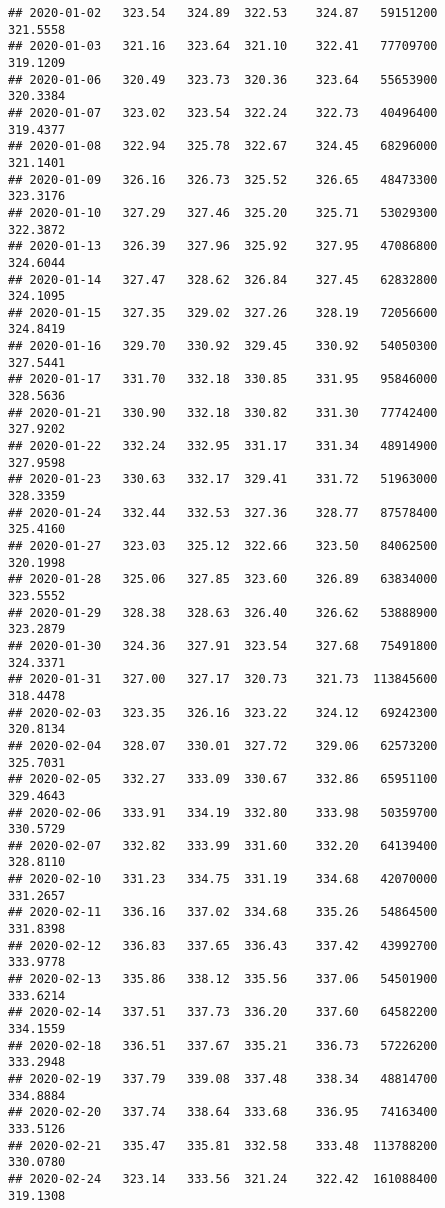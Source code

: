 \documentclass[
]{article}
\begin{document}
\begin{verbatim}
## 2020-01-02   323.54   324.89  322.53    324.87   59151200     321.5558
## 2020-01-03   321.16   323.64  321.10    322.41   77709700     319.1209
## 2020-01-06   320.49   323.73  320.36    323.64   55653900     320.3384
## 2020-01-07   323.02   323.54  322.24    322.73   40496400     319.4377
## 2020-01-08   322.94   325.78  322.67    324.45   68296000     321.1401
## 2020-01-09   326.16   326.73  325.52    326.65   48473300     323.3176
## 2020-01-10   327.29   327.46  325.20    325.71   53029300     322.3872
## 2020-01-13   326.39   327.96  325.92    327.95   47086800     324.6044
## 2020-01-14   327.47   328.62  326.84    327.45   62832800     324.1095
## 2020-01-15   327.35   329.02  327.26    328.19   72056600     324.8419
## 2020-01-16   329.70   330.92  329.45    330.92   54050300     327.5441
## 2020-01-17   331.70   332.18  330.85    331.95   95846000     328.5636
## 2020-01-21   330.90   332.18  330.82    331.30   77742400     327.9202
## 2020-01-22   332.24   332.95  331.17    331.34   48914900     327.9598
## 2020-01-23   330.63   332.17  329.41    331.72   51963000     328.3359
## 2020-01-24   332.44   332.53  327.36    328.77   87578400     325.4160
## 2020-01-27   323.03   325.12  322.66    323.50   84062500     320.1998
## 2020-01-28   325.06   327.85  323.60    326.89   63834000     323.5552
## 2020-01-29   328.38   328.63  326.40    326.62   53888900     323.2879
## 2020-01-30   324.36   327.91  323.54    327.68   75491800     324.3371
## 2020-01-31   327.00   327.17  320.73    321.73  113845600     318.4478
## 2020-02-03   323.35   326.16  323.22    324.12   69242300     320.8134
## 2020-02-04   328.07   330.01  327.72    329.06   62573200     325.7031
## 2020-02-05   332.27   333.09  330.67    332.86   65951100     329.4643
## 2020-02-06   333.91   334.19  332.80    333.98   50359700     330.5729
## 2020-02-07   332.82   333.99  331.60    332.20   64139400     328.8110
## 2020-02-10   331.23   334.75  331.19    334.68   42070000     331.2657
## 2020-02-11   336.16   337.02  334.68    335.26   54864500     331.8398
## 2020-02-12   336.83   337.65  336.43    337.42   43992700     333.9778
## 2020-02-13   335.86   338.12  335.56    337.06   54501900     333.6214
## 2020-02-14   337.51   337.73  336.20    337.60   64582200     334.1559
## 2020-02-18   336.51   337.67  335.21    336.73   57226200     333.2948
## 2020-02-19   337.79   339.08  337.48    338.34   48814700     334.8884
## 2020-02-20   337.74   338.64  333.68    336.95   74163400     333.5126
## 2020-02-21   335.47   335.81  332.58    333.48  113788200     330.0780
## 2020-02-24   323.14   333.56  321.24    322.42  161088400     319.1308

\end{verbatim}
\end{document}
